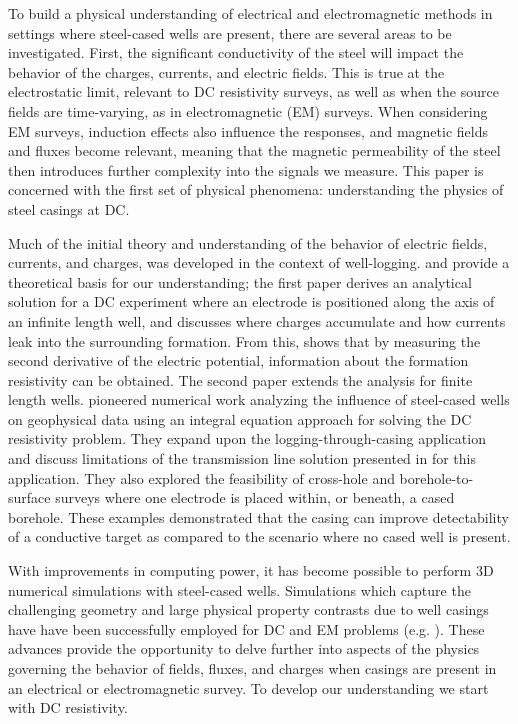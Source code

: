 To build a physical understanding of electrical and electromagnetic methods in settings where steel-cased wells are present, there are several areas to be investigated. First, the significant conductivity of the steel will impact the behavior of the charges, currents, and electric fields. This is true at the electrostatic limit, relevant to DC resistivity surveys, as well as when the source fields are time-varying, as in electromagnetic (EM) surveys. When considering EM surveys, induction effects also influence the responses, and magnetic fields and fluxes become relevant, meaning that the magnetic permeability of the steel then introduces further complexity into the signals we measure. This paper is concerned with the first set of physical phenomena: understanding the physics of steel casings at DC.

Much of the initial theory and understanding of the behavior of electric fields, currents, and charges, was developed in the context of well-logging. \cite{Kaufman1990} and \cite{Kaufman1993} provide a theoretical basis for our understanding; the first paper derives an analytical solution for a DC experiment where an electrode is positioned along the axis of an infinite length well, and discusses where charges accumulate and how currents leak into the surrounding formation. From this, \cite{Kaufman1990} shows that by measuring the second derivative of the electric potential, information about the formation resistivity can be obtained. The second paper extends the analysis for finite length wells. \cite{Schenkel1990, Schenkel1991, Schenkel1994} pioneered numerical work analyzing the influence of steel-cased wells on geophysical data using an integral equation approach for solving the DC resistivity problem. They expand upon the logging-through-casing application and discuss limitations of the transmission line solution presented in \cite{Kaufman1990} for this application. They also explored the feasibility of cross-hole and borehole-to-surface surveys where one electrode is placed within, or beneath, a cased borehole. These examples demonstrated that the casing can improve detectability of a conductive target as compared to the scenario where no cased well is present.

With improvements in computing power, it has become possible to perform 3D numerical simulations with steel-cased wells. Simulations which capture the challenging geometry and large physical property contrasts due to well casings have have been successfully employed for DC and EM problems (e.g. \cite{Swidinsky2013, Commer2015, Hoversten2015, Tang2015, Um2015, Weiss2016, Yang2016, Heagy2018a}). These advances provide the opportunity to delve further into aspects of the physics governing the behavior of fields, fluxes, and charges when casings are present in an electrical or electromagnetic survey. To develop our understanding we start with DC resistivity.

